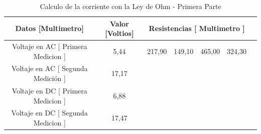 \documentclass[letterpaper, 12pt]{report}
\begin{document}
\begin{table}[H]
	\begin{center}
		\begin{tabular}{|c|c|c|c|c|c|c|c|c|c|}
			\hline
			\multicolumn{3}{c}{Datos [Multimetro]}                 &
			\multicolumn{2}{c}{Valor [Voltios]}                    &
			\multicolumn{4}{c}{Resistencias [ Multimetro ]}          \\ \hline

			\multicolumn{3}{c}{Voltaje en AC [ Primera Medicion ]} &
			\multicolumn{2}{c}{5,44}                               &
			217,90                                                 &
			149,10                                                 &
			465,00                                                 &
			324,30                                                   \\

			\multicolumn{3}{c}{Voltaje en AC [ Segunda Medición ]} &
			\multicolumn{2}{c}{17,17}                              &
			                                                       &
			                                                       &
			                                                       &
			\\

			\multicolumn{3}{c}{Voltaje en DC [ Primera Medicion ]} &
			\multicolumn{2}{c}{6,88}                               &
			                                                       &
			                                                       &
			                                                       &
			\\

			\multicolumn{3}{c}{Voltaje en DC [ Segunda Medicion ]} &
			\multicolumn{2}{c}{17,47}                              &
			                                                       &
			                                                       &
			                                                       &
			\\ \hline
		\end{tabular}
		\caption{Calculo de la corriente con la Ley de Ohm - Primera Parte}
		\label{tab:LeyDeOhmPrimeraParte}
	\end{center}
\end{table}
\end{document}
